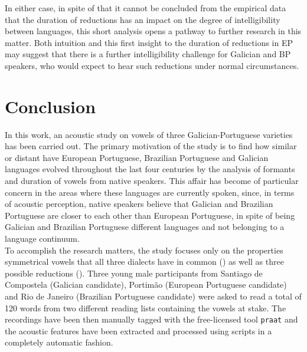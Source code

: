 \documentclass[a4paper,11pt]{article}
\begin{document}
In either case, in spite of that it cannot be concluded from the empirical data that the duration of reductions has an impact on the degree of intelligibility between languages, this short analysis opens a pathway to further research in this matter. Both intuition and this first insight to the duration of reductions in EP may suggest that there is a further intelligibility challenge for Galician and BP speakers, who would expect to hear such reductions under normal circumstances.
     

\section{Conclusion}

In this work, an acoustic study on vowels of three Galician-Portuguese varieties has been carried out. The primary motivation of the study is to find how similar or distant have  European Portuguese, Brazilian Portuguese and Galician languages evolved throughout the last four centuries by the analysis of formants and duration of vowels from native speakers. This affair has become of particular concern in the areas where these languages are currently spoken, since, in terms of acoustic perception, native speakers believe that Galician and Brazilian Portuguese are closer to each other than European Portuguese, in spite of being Galician and Brazilian Portuguese different languages and not belonging to a language continuum.\\

To accomplish the research matters, the study focuses only on the properties symmetrical vowels that all three dialects have in common () as well as three possible reductions (). Three young male participants from Santiago de Compostela (Galician candidate), Portim\~ao (European Portuguese candidate) and Rio de Janeiro (Brazilian Portuguese candidate) were asked to read a total of 120 words from two different reading lists containing the vowels at stake. The recordings have been then manually tagged with the free-licensed tool \texttt{praat} and the acoustic features have been extracted and processed using scripts in a completely automatic fashion. \\
\end{document}

